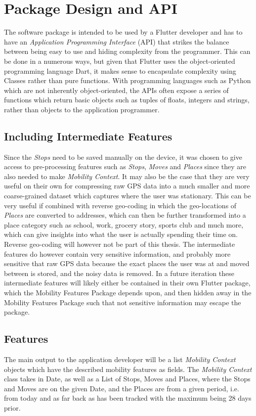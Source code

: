 \section{Package Design and API}
The software package is intended to be used by a Flutter developer and has to have an \textit{Application Programming Interface} (API) that strikes the balance between being easy to use and hiding complexity from the programmer. This can be done in a numerous ways, but given that Flutter uses the object-oriented programming language Dart, it makes sense to encapsulate complexity using Classes rather than pure functions. With programming languages such as Python which are not inherently object-oriented, the APIs often expose a series of functions which return basic objects such as tuples of floats, integers and strings, rather than objects to the application programmer.

\subsection{Including Intermediate Features}
Since the \textit{Stops} need to be saved manually on the device, it was chosen to give access to pre-processing features such as \textit{Stops}, \textit{Moves} and \textit{Places} since they are also needed to make \textit{Mobility Context}. It may also be the case that they are very useful on their own for compressing raw GPS data into a much smaller and more coarse-grained dataset which captures where the user was stationary. This can be very useful if combined with reverse geo-coding in which the geo-locations of \textit{Places} are converted to addresses, which can then be further transformed into a place category such as school, work, grocery story, sports club and much more, which can give insights into what the user is actually spending their time on. Reverse geo-coding will however not be part of this thesis. The intermediate features do however contain very sensitive information, and probably more sensitive that raw GPS data because the exact places the user was at and moved between is stored, and the noisy data is removed. In a future iteration these intermediate features will likely either be contained in their own Flutter package, which the Mobility Features Package depends upon, and then hidden away in the Mobility Features Package such that not sensitive information may escape the package.

\subsection{Features}
The main output to the application developer will be a list \textit{Mobility Context} objects which have the described mobility features as fields. The \textit{Mobility Context} class takes in Date, as well as a List of Stops, Moves and Places, where the Stops and Moves are on the given Date, and the Places are from a given period, i.e. from today and as far back as has been tracked with the maximum being 28 days prior. 


